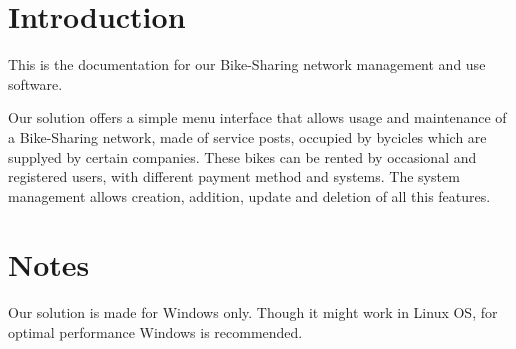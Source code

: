 \hypertarget{index_intro_sec}{}\section{Introduction}\label{index_intro_sec}
This is the documentation for our Bike-\/\+Sharing network management and use software.

Our solution offers a simple menu interface that allows usage and maintenance of a Bike-\/\+Sharing network, made of service posts, occupied by bycicles which are supplyed by certain companies. These bikes can be rented by occasional and registered users, with different payment method and systems. The system management allows creation, addition, update and deletion of all this features.\hypertarget{index_notes_sec}{}\section{Notes}\label{index_notes_sec}
Our solution is made for Windows only. Though it might work in Linux O\+S, for optimal performance Windows is recommended. 